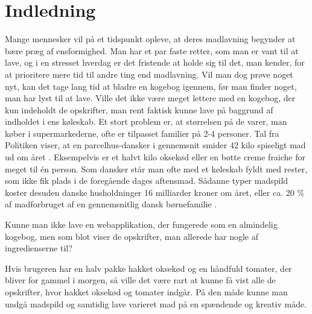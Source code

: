 \chapter{Indledning}
\label{chap:indledning}

Mange mennesker vil på et tidspunkt opleve, at deres madlavning begynder at bære præg af ensformighed. Man har et par faste retter, som man er vant til at lave, og i en stresset hverdag er det fristende at holde sig til det, man kender, for at prioritere mere tid til andre ting end madlavning. Vil man dog prøve noget nyt, kan det tage lang tid at bladre en kogebog igennem, før man finder noget, man har lyst til at lave. Ville det ikke være meget lettere med en kogebog, der kun indeholdt de opskrifter, man rent faktisk kunne lave på baggrund af indholdet i ens køleskab. Et stort problem er, at størrelsen på de varer, man køber i supermarkederne, ofte er tilpasset familier på 2-4 personer. Tal fra Politiken viser, at en parcelhus-dansker i gennemsnit smider 42 kilo spiseligt mad ud om året \cite{madspildpol}. Eksempelvis er et halvt kilo oksekød eller en bøtte creme fraiche for meget til én person. Som dansker står man ofte med et køleskab fyldt med rester, som ikke fik plads i de foregående dages aftensmad. Sådanne typer madspild koster desuden danske husholdninger 16 milliarder kroner om året, eller ca. 20 \% af madforbruget af en gennemsnitlig dansk børnefamilie \cite{madspild16}. 

Kunne man ikke lave en webapplikation, der fungerede som en almindelig kogebog, men som blot viser de opskrifter, man allerede har nogle af ingredienserne til? 

Hvis brugeren har en halv pakke hakket oksekød og en håndfuld tomater, der bliver for gammel i morgen, så ville det være rart at kunne få vist alle de opskrifter, hvor hakket oksekød og tomater indgår. På den måde kunne man undgå madspild og samtidig lave varieret mad på en spændende og kreativ måde.


